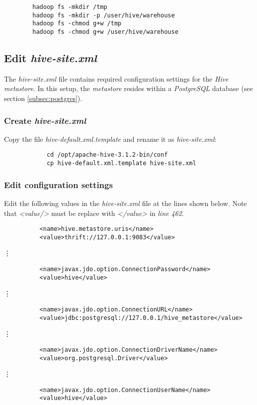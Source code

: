 \documentclass{article}
\begin{document}
    \begin{verbatim}
        hadoop fs -mkdir /tmp 
        hadoop fs -mkdir -p /user/hive/warehouse 
        hadoop fs -chmod g+w /tmp 
        hadoop fs -chmod g+w /user/hive/warehouse
    \end{verbatim}

    \subsection{Edit \emph{hive-site.xml}}
    The \emph{hive-site.xml} file contains required configuration settings for the \emph{Hive metastore}.
    In this setup, the \emph{metastore} resides within a \emph{PostgreSQL} database (see section \ref{subsec:postgres}).

        \subsubsection{Create \emph{hive-site.xml}}
        Copy the file \emph{hive-default.xml.template} and rename it as \emph{hive-site.xml}:
        \begin{verbatim}
            cd /opt/apache-hive-3.1.2-bin/conf
            cp hive-default.xml.template hive-site.xml
        \end{verbatim}
        
        \subsubsection{Edit configuration settings}
        Edit the following values in the \emph{hive-site.xml} file at the lines shown below. Note
        that \emph{\textless value/\textgreater} must be replace with \emph{\textless /value\textgreater} in \emph{line 462}.
        \begin{verbatim}
          <name>hive.metastore.uris</name>
          <value>thrift://127.0.0.1:9083</value>
        \end{verbatim}
        \centerline{\vdots}
        \begin{verbatim}
          <name>javax.jdo.option.ConnectionPassword</name>
          <value>hive</value>
        \end{verbatim}
        \centerline{\vdots}
        \begin{verbatim}
          <name>javax.jdo.option.ConnectionURL</name>
          <value>jdbc:postgresql://127.0.0.1/hive_metastore</value>
        \end{verbatim}
        \centerline{\vdots}
        \begin{verbatim}
          <name>javax.jdo.option.ConnectionDriverName</name>
          <value>org.postgresql.Driver</value>
        \end{verbatim}
        \centerline{\vdots}
        \begin{verbatim}
          <name>javax.jdo.option.ConnectionUserName</name>
          <value>hive</value>
        \end{verbatim}
        
\end{document}

